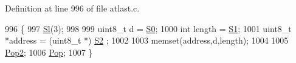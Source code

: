 Definition at line 996 of file atlast.\+c.


\begin{DoxyCode}
996                 \{
997     \hyperlink{atldef_8h_a5926d5feea48dfae9eef1fb4e2bdb5fa}{Sl}(3);
998 
999     uint8\_t d = \hyperlink{atldef_8h_a5cfab9793f7fd3ac4ab45eff41df9f37}{S0};
1000     \textcolor{keywordtype}{int} length = \hyperlink{atldef_8h_a690d30e9ad3647835c243368b36d4c41}{S1};
1001     uint8\_t *address = (uint8\_t *) \hyperlink{atldef_8h_ad5e70dee3c36d645b0eb1743b8a7d2bf}{S2} ;
1002 
1003     memset(address,d,length);
1004 
1005     \hyperlink{atldef_8h_aa25c480f1a1ad10fdb756d8fd02a98ea}{Pop2};
1006     \hyperlink{atldef_8h_ad590ef6976fe2df5123108916638a353}{Pop};
1007 \}
\end{DoxyCode}
